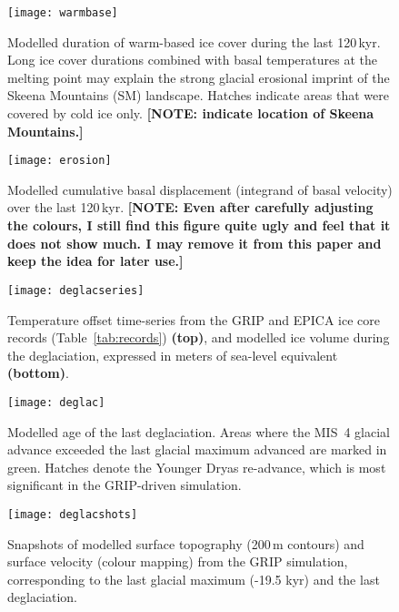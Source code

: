 \documentclass[tc, ms]{copernicus}
\newcommand{\note}[1]{\textbf{[NOTE: #1]}}
\begin{document}
\begin{figure}
  \texttt{[image: warmbase]}
  \caption{Modelled duration of warm-based ice cover during the last
           120\,\unit{kyr}. Long ice cover durations combined with basal
           temperatures at the melting point may explain the strong glacial
           erosional imprint of the Skeena Mountains (SM) landscape. Hatches
           indicate areas that were covered by cold ice only.
           \note{indicate location of Skeena Mountains.}}
  \label{fig:warmbase}
\end{figure}

\begin{figure}
  \texttt{[image: erosion]}
  \caption{Modelled cumulative basal displacement (integrand of basal velocity)
           over the last 120\,\unit{kyr}.
           \note{Even after carefully adjusting the colours, I still find this
                 figure quite ugly and feel that it does not show much. I may
                 remove it from this paper and keep the idea for later use.}}
  \label{fig:erosion}
\end{figure}

\begin{figure}
  \texttt{[image: deglacseries]}
  \caption{Temperature offset time-series from the GRIP and EPICA ice core
           records (Table~\ref{tab:records}) \textbf{(top)}, and modelled ice
           volume during the deglaciation, expressed in meters of sea-level
           equivalent \textbf{(bottom)}.}
  \label{fig:deglacseries}
\end{figure}

\begin{figure}
  \texttt{[image: deglac]}
  \caption{Modelled age of the last deglaciation. Areas where the MIS~4 glacial
           advance exceeded the last glacial maximum advanced are marked in
           green. Hatches denote the Younger Dryas re-advance, which is most
           significant in the GRIP-driven simulation.}
  \label{fig:deglac}
\end{figure}

\begin{figure}
  \texttt{[image: deglacshots]}
  \caption{Snapshots of modelled surface topography (200\,\unit{m} contours)
           and surface velocity (colour mapping) from the GRIP simulation,
           corresponding to the last glacial maximum (-19.5 kyr) and the last
           deglaciation.}
  \label{fig:deglacshots}
\end{figure}
\end{document}

